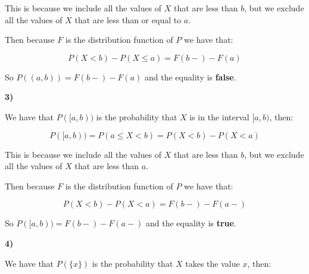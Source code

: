 \singlespacing

This is because we include all the values of $X$ that are less than $b$,
but we exclude all the values of $X$ that are less than or equal to $a$.

\singlespacing

Then because $F$ is the distribution function of $P$ we have that:

\singlespacing

\begin{equation}
    P(X < b) - P(X \leq a) = F(b-) - F(a)
\end{equation}

\singlespacing

So $P((a, b)) = F(b-) - F(a)$ and the equality is \textbf{false}.

\singlespacing

\break

\textbf{3)}

\singlespacing

We have that $P([a, b))$ is the probability that $X$ is in the interval $[a, b)$, then:

\singlespacing

\begin{equation}
    P([a, b)) = P(a \leq X < b) = P(X < b) - P(X < a)
\end{equation}

\singlespacing

This is because we include all the values of $X$ that are less than $b$,
but we exclude all the values of $X$ that are less than $a$.

\singlespacing

Then because $F$ is the distribution function of $P$ we have that:

\singlespacing

\begin{equation}
    P(X < b) - P(X < a) = F(b-) - F(a-)
\end{equation}

\singlespacing

So $P([a, b)) = F(b-) - F(a-)$ and the equality is \textbf{true}.

\singlespacing
\singlespacing
\singlespacing

\textbf{4)}

\singlespacing

We have that $P(\{x\})$ is the probability that $X$ takes the value $x$, then:

\singlespacing

